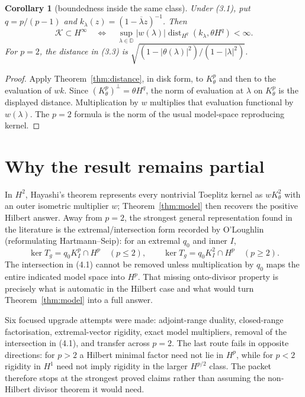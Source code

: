 \documentclass[11pt]{article}
\newtheorem{corollary}[theorem]{Corollary}
\newcommand{\D}{\mathbb D}
\newcommand{\dist}{\operatorname{dist}}
\begin{document}
\begin{corollary}[boundedness inside the same class]
Under (3.1), put $q=p/(p-1)$ and
$k_\lambda(z)=(1-\overline\lambda z)^{-1}$.  Then
\[
 \mathcal K\subset H^\infty
 \quad\Longleftrightarrow\quad
 \sup_{\lambda\in\D}|w(\lambda)|
 \dist_{H^q}(k_\lambda,\theta H^q)<\infty.                             \tag{3.3}
\]
For $p=2$, the distance in (3.3) is
$\sqrt{(1-|\theta(\lambda)|^2)/(1-|\lambda|^2)}$.
\end{corollary}

\begin{proof}
Apply Theorem~\ref{thm:distance}, in disk form, to $K_\theta^p$ and then to
the evaluation of $wk$.  Since
$(K_\theta^p)^\perp=\theta H^q$, the norm of evaluation at $\lambda$ on
$K_\theta^p$ is the displayed distance.  Multiplication by $w$ multiplies
that evaluation functional by $w(\lambda)$.  The $p=2$ formula is the norm of
the usual model-space reproducing kernel.
\end{proof}

\section{Why the result remains partial}

In $H^2$, Hayashi's theorem represents every nontrivial Toeplitz kernel as
$wK_\theta^2$ with an outer isometric multiplier $w$; Theorem~\ref{thm:model}
then recovers the positive Hilbert answer.  Away from $p=2$, the strongest
general representation found in the literature is the extremal/intersection
form recorded by O'Loughlin (reformulating Hartmann--Seip): for an extremal
$q_0$ and inner $I$,
\[
 \ker T_g=q_0K_I^p\cap H^p\quad(p\le2),\qquad
 \ker T_g=q_0K_I^2\cap H^p\quad(p\ge2).                                \tag{4.1}
\]
The intersection in (4.1) cannot be removed unless multiplication by $q_0$
maps the entire indicated model space into $H^p$.  That missing onto-divisor
property is precisely what is automatic in the Hilbert case and what would
turn Theorem~\ref{thm:model} into a full answer.

Six focused upgrade attempts were made: adjoint-range duality, closed-range
factorisation, extremal-vector rigidity, exact model multipliers, removal of
the intersection in (4.1), and transfer across $p=2$.  The last route fails in
opposite directions: for $p>2$ a Hilbert minimal factor need not lie in $H^p$,
while for $p<2$ rigidity in $H^1$ need not imply rigidity in the larger
$H^{p/2}$ class.  The packet therefore stops at the strongest proved claims
rather than assuming the non-Hilbert divisor theorem it would need.
\end{document}
